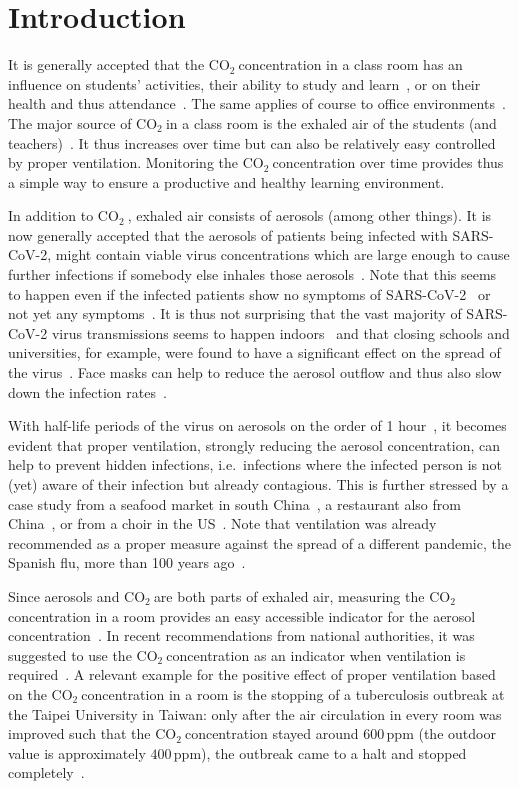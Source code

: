 \documentclass[12pt,a4paper]{article}
\newcommand{\coo}{\ensuremath{\mathrm{CO_2}~}}
\begin{document}
\section{Introduction}\label{s:intro}
It is generally accepted that the \coo concentration in a class room has an influence on students' activities, their ability to study and learn~\cite{TWARDELLA2012,GAIHRE2014}, or on their health and thus attendance~\cite{SHENDELL2004}. The same applies of course to office environments~\cite{ALLEN2016}. The major source of \coo in a class room is the exhaled air of the students (and teachers)~\cite{PERSILY2017}. It thus increases over time but can also be relatively easy controlled by proper ventilation. Monitoring the \coo concentration over time provides thus a simple way to ensure a productive and healthy learning environment. 

In addition to \coo, exhaled air consists of aerosols (among other things). It is now generally accepted that the aerosols of patients being infected with SARS-CoV-2, might contain viable virus concentrations which are large enough to cause further infections if somebody else inhales those aerosols~\cite{LEDNICKY2020,MORAWSKA2020,KOHANSKI2020,SETTI2020}. Note that this seems to happen even if the infected patients show no symptoms of SARS-CoV-2~\cite{FURUKAWA2020} or not yet any symptoms~\cite{SUN2020}. It is thus not surprising that the vast majority of SARS-CoV-2 virus transmissions seems to happen indoors~\cite{QIAN2020} and that closing schools and universities, for example, were found to have a significant effect on the spread of the virus~\cite{BRAUNER2020}. Face masks can help to reduce the aerosol outflow and thus also slow down the infection rates~\cite{HOWARD2020,MITTAL2020}. 

With half-life periods of the virus on aerosols on the order of 1 hour~\cite{DOREMALEN2020}, it becomes evident that proper ventilation, strongly reducing the aerosol concentration, can help to prevent hidden infections, i.e.\ infections where the infected person is not (yet) aware of their infection but already contagious. This is further stressed by a case study from a seafood market in south China~\cite{ZHANG2020}, a restaurant also from China~\cite{LI2020}, or from a choir in the US~\cite{MILLER2020}. Note that ventilation was already recommended as a proper measure against the spread of a different pandemic, the Spanish flu, more than 100 years ago~\cite{SOPER1919}. 

Since aerosols and \coo are both parts of exhaled air, measuring the \coo concentration in a room provides an easy accessible indicator for the aerosol concentration~\cite{HARTMANN2020,BHAGAT2020}. In recent recommendations from national authorities, it was suggested to use the \coo concentration as an indicator when ventilation is required~\cite{VOSS2020,BMA2020a,RKI2020}. A relevant example for the positive effect of proper ventilation based on the \coo concentration in a room is the stopping of a tuberculosis outbreak at the Taipei University in Taiwan: only after the air circulation in every room was improved such that the \coo concentration stayed around $600\,\mathrm{ppm}$ (the outdoor value is approximately $400\,\mathrm{ppm}$), the outbreak came to a halt and stopped completely~\cite{DU2020}. 
\end{document}
